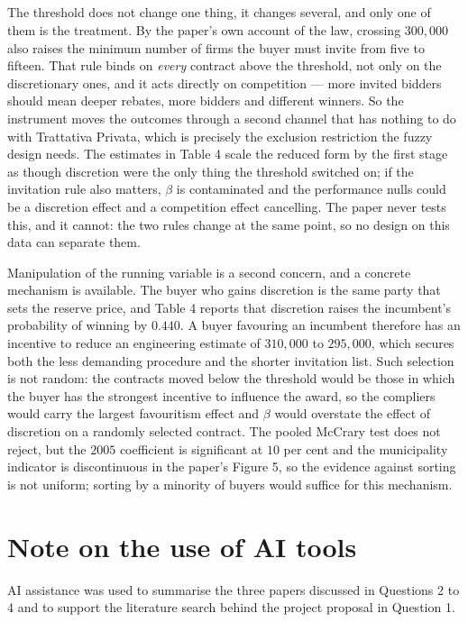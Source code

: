 \documentclass[11pt]{article}
\begin{document}
\subsection{}
The threshold does not change one thing, it changes several, and only one of
them is the treatment. By the paper's own account of the law, crossing
\texteuro$300{,}000$ also raises the minimum number of firms the buyer must
invite from five to fifteen. That rule binds on \emph{every} contract above
the threshold, not only on the discretionary ones, and it acts directly on
competition --- more invited bidders should mean deeper rebates, more bidders
and different winners. So the instrument moves the outcomes through a second
channel that has nothing to do with Trattativa Privata, which is precisely the
exclusion restriction the fuzzy design needs. The estimates in Table 4 scale
the reduced form by the first stage as though discretion were the only thing
the threshold switched on; if the invitation rule also matters, $\beta$ is
contaminated and the performance nulls could be a discretion effect and a
competition effect cancelling. The paper never tests this, and it cannot:
the two rules change at the same point, so no design on this data can
separate them.

Manipulation of the running variable is a second concern, and a concrete
mechanism is available. The buyer who gains discretion is the same party that
sets the reserve price, and Table 4 reports that discretion raises the
incumbent's probability of winning by $0.440$. A buyer favouring an incumbent
therefore has an incentive to reduce an engineering estimate of
\texteuro$310{,}000$ to \texteuro$295{,}000$, which secures both the less
demanding procedure and the shorter invitation list. Such selection is not
random: the contracts moved below the threshold would be those in which the
buyer has the strongest incentive to influence the award, so the compliers
would carry the largest favouritism effect and $\beta$ would overstate the
effect of discretion on a randomly selected contract.
The pooled McCrary test does not reject, but the $2005$ coefficient is
significant at $10$ per cent and the municipality indicator is discontinuous
in the paper's Figure 5, so the evidence against sorting is not uniform;
sorting by a
minority of buyers would suffice for this mechanism.

\section*{Note on the use of AI tools}
AI assistance was used to summarise the three papers discussed in Questions 2
to 4 and to support the literature search behind the project proposal in
Question 1.
\end{document}
